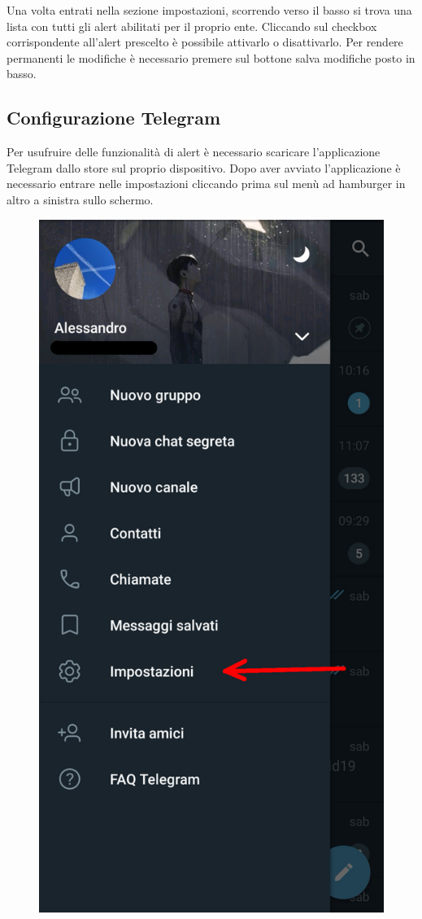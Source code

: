		Una volta entrati nella sezione impostazioni, scorrendo verso il basso si trova una lista con tutti gli alert abilitati per il proprio ente. Cliccando sul checkbox corrispondente all'alert prescelto è possibile attivarlo o disattivarlo. Per rendere permanenti le modifiche è necessario premere sul bottone salva modifiche posto in basso.
	

\subsection{Configurazione Telegram}
	Per usufruire delle funzionalità di alert è necessario scaricare l'applicazione Telegram dallo store sul proprio dispositivo.
	Dopo aver avviato l'applicazione è necessario entrare nelle impostazioni cliccando prima sul menù ad hamburger in altro a sinistra sullo schermo.
	\begin{figure}[H]
		\centering
		\includegraphics[scale=0.100]{res/images/telegram1.jpg}

\end{figure}
